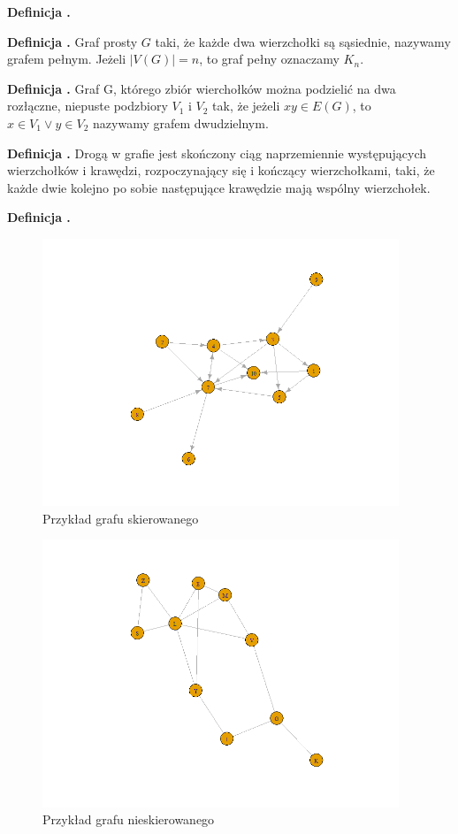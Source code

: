 \noindent
\textbf{Definicja \graphDefinitionIndex.}
\incrementGraphDefinitionIndex

\noindent
\textbf{Definicja \graphDefinitionIndex.}
\incrementGraphDefinitionIndex
Graf prosty $G$ taki, że każde dwa wierzchołki są sąsiednie, nazywamy grafem pełnym.
Jeżeli $|V(G)| = n$, to graf pełny oznaczamy $K_n$.

\noindent
\textbf{Definicja \graphDefinitionIndex.}
\incrementGraphDefinitionIndex
Graf G, którego zbiór wierchołków można podzielić na dwa rozłączne, niepuste podzbiory $V_1$ i $V_2$ tak,
że jeżeli $xy \in E(G)$, to $x \in V_1 \vee y \in V_2$ nazywamy grafem dwudzielnym.

\noindent
\textbf{Definicja \graphDefinitionIndex.}
\incrementGraphDefinitionIndex
Drogą w grafie jest skończony ciąg naprzemiennie występujących wierzchołków i krawędzi, rozpoczynający się
i kończący wierzchołkami, taki, że każde dwie kolejno po sobie następujące krawędzie mają wspólny wierzchołek.

\noindent
\textbf{Definicja \graphDefinitionIndex.}
\incrementGraphDefinitionIndex

\begin{figure}[ht]
	\centering
	\includegraphics[height=8cm]{partials/images/graph_directed.png}
	\caption{Przykład grafu skierowanego}
	\label{Fig:graphs-undirected-1}
\end{figure}
\FloatBarrier

\begin{figure}[ht]
	\centering
	\includegraphics[height=8cm]{partials/images/graph_undirected.png}
	\caption{Przykład grafu nieskierowanego}
	\label{Fig:graphs-directed-1}
\end{figure}
\FloatBarrier